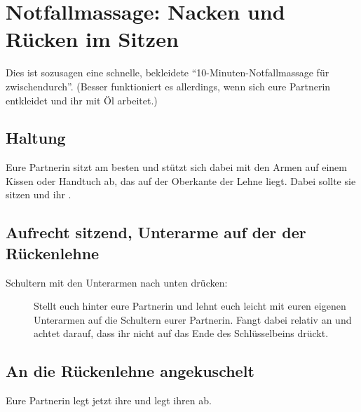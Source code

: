 \section{Notfallmassage: Nacken und Rücken im Sitzen}

Dies ist sozusagen eine schnelle, bekleidete "`10-Minuten-Notfallmassage für zwischendurch"'. (Besser funktioniert es allerdings, wenn sich eure Partnerin entkleidet und ihr mit Öl arbeitet.)

\subsection{Haltung}

Eure Partnerin sitzt am besten  und stützt sich dabei mit den Armen auf einem Kissen oder Handtuch ab, das auf der Oberkante der Lehne liegt. Dabei sollte sie  sitzen und ihr .

\pagebreak
\subsection{Aufrecht sitzend, Unterarme auf der der Rückenlehne}

\begin{description}
  \item [Schultern mit den Unterarmen nach unten drücken:] Stellt euch hinter eure Partnerin und lehnt euch leicht mit euren eigenen Unterarmen auf die Schultern eurer Partnerin. Fangt dabei relativ  an und achtet darauf, dass ihr nicht auf das Ende des Schlüsselbeins drückt.
\end{description}

\subsection{An die Rückenlehne angekuschelt}

Eure Partnerin legt jetzt ihre  und legt ihren  ab.

